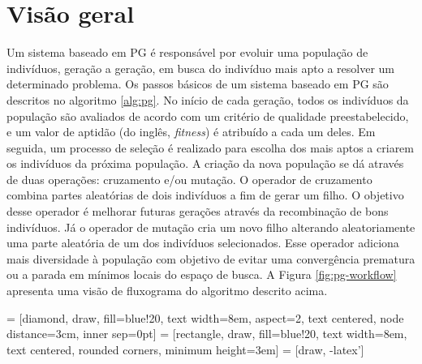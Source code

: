 \section{Visão geral} \label{sec:overview}
Um sistema baseado em PG é responsável por evoluir uma população de indivíduos, geração a geração, em busca do indivíduo mais apto a resolver um determinado problema. Os passos básicos de um sistema baseado em PG são descritos no algoritmo \ref{alg:pg}. No início de cada geração, todos os indivíduos da população são avaliados de acordo com um critério de qualidade preestabelecido, e um valor de aptidão (do inglês, \textit{fitness}) é atribuído a cada um deles. Em seguida, um processo de seleção é realizado para escolha dos mais aptos a criarem os indivíduos da próxima população. A criação da nova população se dá através de duas operações: cruzamento e/ou mutação. O operador de cruzamento combina partes aleatórias de dois indivíduos a fim de gerar um filho. O objetivo desse operador é melhorar futuras gerações através da recombinação de bons indivíduos. Já o operador de mutação cria um novo filho alterando aleatoriamente uma parte aleatória de um dos indivíduos selecionados. Esse operador adiciona mais diversidade à população com objetivo de evitar uma convergência prematura ou a parada em mínimos locais do espaço de busca. A Figura \ref{fig:pg-workflow} apresenta uma visão de fluxograma do algoritmo descrito acima.

 = [diamond, draw, fill=blue!20,
    text width=8em, aspect=2, text centered, node distance=3cm, inner sep=0pt]
 = [rectangle, draw, fill=blue!20,
    text width=8em, text centered, rounded corners, minimum height=3em]
 = [draw, -latex']

